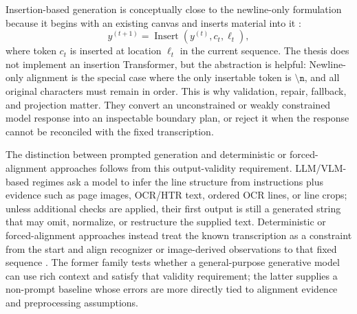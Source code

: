 Insertion-based generation is conceptually close to the newline-only formulation because it begins with an existing canvas and inserts material into it :
\begin{equation}
y^{(t+1)}=\operatorname{Insert}\!\left(y^{(t)}, c_t, \ell_t\right),
\label{eq:insertion_update}
\end{equation}
where token \(c_t\) is inserted at location \(\ell_t\) in the current sequence. The thesis does not implement an insertion Transformer, but the abstraction is helpful: Newline-only alignment is the special case where the only insertable token is \(\texttt{\textbackslash n}\), and all original characters must remain in order. This is why validation, repair, fallback, and projection matter. They convert an unconstrained or weakly constrained model response into an inspectable boundary plan, or reject it when the response cannot be reconciled with the fixed transcription.

The distinction between prompted generation and deterministic or forced-alignment approaches follows from this output-validity requirement. LLM/VLM-based regimes ask a model to infer the line structure from instructions plus evidence such as page images, OCR/HTR text, ordered OCR lines, or line crops; unless additional checks are applied, their first output is still a generated string that may omit, normalize, or restructure the supplied text. Deterministic or forced-alignment approaches instead treat the known transcription as a constraint from the start and align recognizer or image-derived observations to that fixed sequence . The former family tests whether a general-purpose generative model can use rich context and satisfy that validity requirement; the latter supplies a non-prompt baseline whose errors are more directly tied to alignment evidence and preprocessing assumptions.
